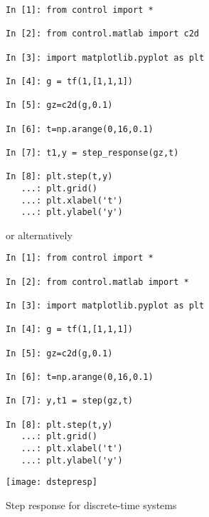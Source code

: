 \begin{figure}[htbp]	%
\begin{minipage}[t]{0.55\textwidth}
  \vspace{0pt}
\begin{lstlisting}[linewidth=7cm,xleftmargin=0cm]
In [1]: from control import *

In [2]: from control.matlab import c2d

In [3]: import matplotlib.pyplot as plt

In [4]: g = tf(1,[1,1,1])

In [5]: gz=c2d(g,0.1)

In [6]: t=np.arange(0,16,0.1)

In [7]: t1,y = step_response(gz,t)

In [8]: plt.step(t,y) 
   ...: plt.grid()
   ...: plt.xlabel('t')
   ...: plt.ylabel('y')
\end{lstlisting}

or alternatively

\begin{lstlisting}[linewidth=7cm,xleftmargin=0cm]
In [1]: from control import *

In [2]: from control.matlab import *

In [3]: import matplotlib.pyplot as plt

In [4]: g = tf(1,[1,1,1])

In [5]: gz=c2d(g,0.1)

In [6]: t=np.arange(0,16,0.1)

In [7]: y,t1 = step(gz,t)

In [8]: plt.step(t,y) 
   ...: plt.grid()
   ...: plt.xlabel('t')
   ...: plt.ylabel('y')
\end{lstlisting}
\end{minipage}%
\begin{minipage}[t]{0.5\textwidth}
  \vspace{0pt} \centering
  \texttt{[image: dstepresp]}
\end{minipage}
\caption{Step response for discrete-time systems}
\label{F2}
\end{figure}

